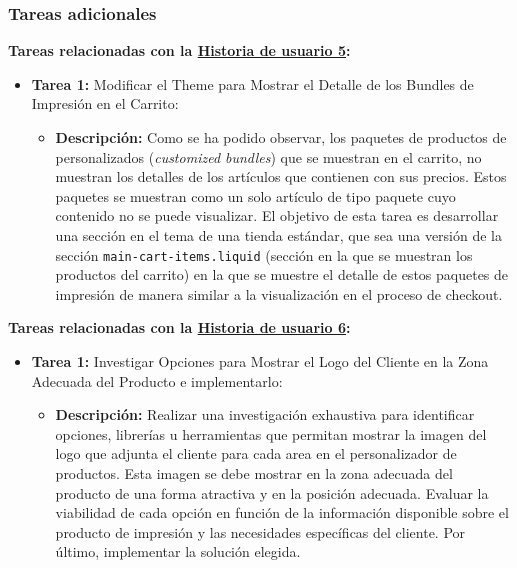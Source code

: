 \documentclass[11pt]{article}
\begin{document}
\subsubsection{Tareas adicionales}

\textbf{Tareas relacionadas con la \hyperref[sec:historia5]{Historia de usuario 5}:}
\begin{itemize}
    \item \textbf{Tarea 1:} Modificar el Theme para Mostrar el Detalle de los Bundles de Impresión en el Carrito:
          \begin{itemize}[label=--]
              \item \textbf{Descripción:} Como se ha podido observar, los paquetes de productos de personalizados (\textit{customized bundles}) que se muestran en el carrito, no muestran los detalles de los artículos que contienen con sus precios. Estos paquetes se muestran como un solo artículo de tipo paquete cuyo contenido no se puede visualizar. El objetivo de esta tarea es desarrollar una sección en el tema de una tienda estándar, que sea una versión de la sección \texttt{main-cart-items.liquid} (sección en la que se muestran los productos del carrito) en la que se muestre el detalle de estos paquetes de impresión de manera similar a la visualización en el proceso de checkout.
          \end{itemize}
\end{itemize}


\textbf{Tareas relacionadas con la \hyperref[sec:historia6]{Historia de usuario 6}:}
\begin{itemize}
    \item \textbf{Tarea 1:} Investigar Opciones para Mostrar el Logo del Cliente en la Zona Adecuada del Producto e implementarlo:
          \begin{itemize}[label=--]
              \item \textbf{Descripción:} Realizar una investigación exhaustiva para identificar opciones, librerías u herramientas que permitan mostrar la imagen del logo que adjunta el cliente para cada area en el personalizador de productos. Esta imagen se debe mostrar en la zona adecuada del producto de una forma atractiva y en la posición adecuada. Evaluar la viabilidad de cada opción en función de la información disponible sobre el producto de impresión y las necesidades específicas del cliente. Por último, implementar la solución elegida.
          \end{itemize}
\end{itemize}
\end{document}
